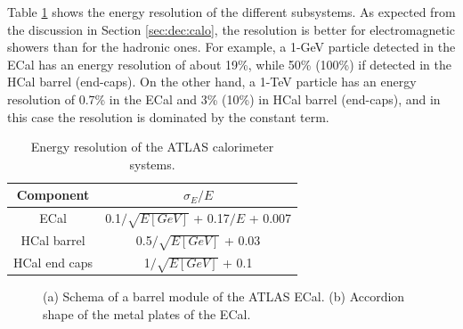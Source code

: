 Table \ref{tab:atlas:cal:reso} shows the energy resolution of the different subsystems. As expected from the discussion in Section \ref{sec:dec:calo}, the resolution is better for electromagnetic showers than for the hadronic ones. For example, a 1-GeV particle detected in the ECal has an energy resolution of about 19\%, while 50\% (100\%) if detected in the HCal barrel (end-caps). On the other hand, a 1-TeV particle has an energy resolution of 0.7\% in the ECal and 3\% (10\%) in  HCal barrel (end-caps), and in this case the resolution is dominated by the constant term.

\begin{table}[ht]
\begin{center}
\begin{tabular}{c c }
\hline
Component & $\sigma_E / E$ \\
\hline 
\hline
ECal & 0.1$/\sqrt{E[GeV]}$ + 0.17$/E$ + 0.007 \\ %
\hline
HCal barrel & 0.5$/\sqrt{E[GeV]}$ + 0.03 \\
\hline
HCal end caps & 1$/\sqrt{E[GeV]}$ + 0.1 \\
\hline
\end{tabular}
\end{center}
\caption{Energy resolution of the ATLAS calorimeter systems.}
\label{tab:atlas:cal:reso}
\end{table}

\begin{figure}[ht]
\centering
{}
\caption{(a) Schema of a barrel module of the ATLAS ECal. (b) Accordion shape of the metal plates of the ECal.}
\label{fig:atlas:lar}
\end{figure}

